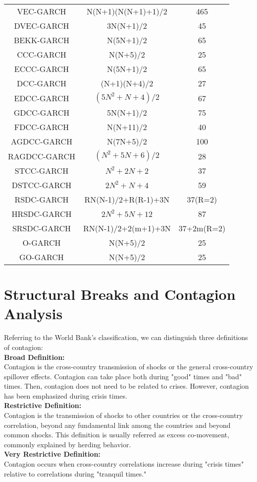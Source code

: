 \documentclass[a4paper,12pt]{article}
\begin{document}
\begin{tabular}{||c||c||c||}
\hline
VEC-GARCH       & N(N+1)(N(N+1)+1)/2     &  465\\
DVEC-GARCH      & 3N(N+1)/2              &  45\\
BEKK-GARCH      & N(5N+1)/2              &  65\\
CCC-GARCH       & N(N+5)/2               &  25\\
ECCC-GARCH      & N(5N+1)/2              &  65\\
DCC-GARCH       & (N+1)(N+4)/2           &  27\\
EDCC-GARCH      & $(5N^2+N+4)/2$         &  67\\
GDCC-GARCH      & 5N(N+1)/2              &  75\\
FDCC-GARCH      & N(N+11)/2              &  40\\
AGDCC-GARCH     & N(7N+5)/2              &  100\\
RAGDCC-GARCH    & $(N^2+5N+6)/2$         &  28\\
STCC-GARCH      & $N^2+2N+2$             &  37\\
DSTCC-GARCH     & $2N^2+N+4$             &  59\\
RSDC-GARCH      & RN(N-1)/2+R(R-1)+3N    &  37(R=2)\\
HRSDC-GARCH     & $2N^2+5N+12$           &  87\\
SRSDC-GARCH     & RN(N-1)/2+2(m+1)+3N    &  37+2m(R=2)\\
O-GARCH         & N(N+5)/2               &  25\\
GO-GARCH        & N(N+5)/2               &  25\\
\hline
\end{tabular}
\section{Structural Breaks and Contagion Analysis}
\noindent Referring to the World Bank's classification, we can distinguish three definitions of contagion:\\
\noindent\textbf{Broad Definition:}\\
\noindent Contagion is the cross-country transmission of shocks or the general cross-country spillover effects.
Contagion can take place both during "good" times and "bad" times. Then, contagion does not need to be related to crises. However, contagion has been emphasized during crisis times.\\
\noindent\textbf{Restrictive Definition:}\\
\noindent Contagion is the transmission of shocks to other countries or the cross-country correlation, beyond
any fundamental link among the countries and beyond common shocks. This definition is usually referred as excess co-movement, commonly explained by herding behavior.\\
\noindent\textbf{Very Restrictive Definition:}\\
Contagion occurs when cross-country correlations increase during "crisis times" relative to correlations
during "tranquil times." \\
\end{document}
